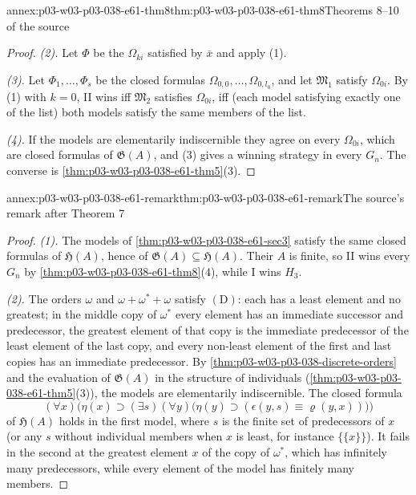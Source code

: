\begin{annexitem}{annex:p03-w03-p03-038-e61-thm8}{thm:p03-w03-p03-038-e61-thm8}{Theorems 8--10 of the source}
\begin{proof}
\emph{(2).} Let \(\Phi\) be the \(\Omega_{ki}\) satisfied by \(\bar x\) and
apply (1).

\emph{(3).} Let \(\Phi_1,\ldots,\Phi_s\) be the closed formulas
\(\Omega_{0,0},\ldots,\Omega_{0,l_0}\), and let \(\mathfrak M_1\) satisfy
\(\Omega_{0i}\). By (1) with \(k=0\), II wins iff \(\mathfrak M_2\)
satisfies \(\Omega_{0i}\), iff (each model satisfying exactly one of the
list) both models satisfy the same members of the list.

\emph{(4).} If the models are elementarily indiscernible they agree on
every \(\Omega_{0i}\), which are closed formulas of \(\mathfrak G(A)\), and
(3) gives a winning strategy in every \(G_n\). The converse is
\cref{thm:p03-w03-p03-038-e61-thm5}(3).
\end{proof}
\end{annexitem}

\begin{annexitem}{annex:p03-w03-p03-038-e61-remark}{thm:p03-w03-p03-038-e61-remark}{The source's remark after Theorem 7}
\begin{proof}
\emph{(1).} The models of \cref{thm:p03-w03-p03-038-e61-sec3} satisfy the
same closed formulas of \(\mathfrak H(A)\), hence of
\(\mathfrak G(A)\subseteq\mathfrak H(A)\). Their \(A\) is finite, so II
wins every \(G_n\) by \cref{thm:p03-w03-p03-038-e61-thm8}(4), while I wins
\(H_3\).

\emph{(2).} The orders \(\omega\) and \(\omega+\omega^*+\omega\) satisfy
\((\mathrm D)\): each has a least element and no greatest; in the middle
copy of \(\omega^*\) every element has an immediate successor and
predecessor, the greatest element of that copy is the immediate
predecessor of the least element of the last copy, and every non-least
element of the first and last copies has an immediate predecessor. By
\cref{thm:p03-w03-p03-038-discrete-orders} and the evaluation of
\(\mathfrak G(A)\) in the structure of individuals
(\cref{thm:p03-w03-p03-038-e61-thm5}(3)), the models are elementarily
indiscernible. The closed formula
\[
 (\forall x)\bigl(\eta(x)\supset(\exists s)(\forall y)\bigl(\eta(y)\supset
 (\epsilon(y,s)\equiv\varrho(y,x))\bigr)\bigr)
\]
of \(\mathfrak H(A)\) holds in the first model, where \(s\) is the finite
set of predecessors of \(x\) (or any \(s\) without individual members when
\(x\) is least, for instance \(\{\{x\}\}\)). It fails in the second at the
greatest element \(x\) of the copy of \(\omega^*\), which has infinitely
many predecessors, while every element of the model has finitely many
members.
\end{proof}
\end{annexitem}


